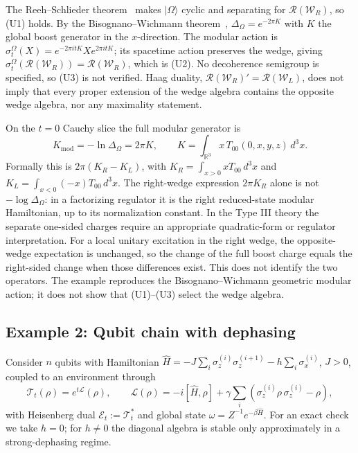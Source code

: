 The Reeh--Schlieder theorem~\cite{Haag1996} makes $|\Omega\rangle$ cyclic and separating for $\mathcal{R}(\mathcal{W}_R)$, so (U1) holds. By the Bisognano--Wichmann theorem~\cite{BisognanoWichmann1975, BisognanoWichmann1976}, $\Delta_\Omega = e^{-2\pi K}$ with $K$ the global boost generator in the $x$-direction. The modular action is $\sigma_t^\Omega(X)=e^{-2\pi itK}Xe^{2\pi itK}$; its spacetime action preserves the wedge, giving $\sigma_t^\Omega(\mathcal{R}(\mathcal{W}_R)) = \mathcal{R}(\mathcal{W}_R)$, which is (U2). No decoherence semigroup is specified, so (U3) is not verified. Haag duality, $\mathcal R(\mathcal W_R)'=\mathcal R(\mathcal W_L)$, does not imply that every proper extension of the wedge algebra contains the opposite wedge algebra, nor any maximality statement.

On the $t=0$ Cauchy slice the full modular generator is
\begin{equation}
K_{\mathrm{mod}} = -\ln \Delta_\Omega = 2\pi K,
\qquad K=\int_{\mathbb R^3}x\,T_{00}(0,x,y,z)\,d^3x .
\end{equation}
Formally this is $2\pi(K_R-K_L)$, with $K_R=\int_{x>0}xT_{00}\,d^3x$ and $K_L=\int_{x<0}(-x)T_{00}\,d^3x$. The right-wedge expression $2\pi K_R$ alone is not $-\log\Delta_\Omega$: in a factorizing regulator it is the right reduced-state modular Hamiltonian, up to its normalization constant. In the Type III theory the separate one-sided charges require an appropriate quadratic-form or regulator interpretation. For a local unitary excitation in the right wedge, the opposite-wedge expectation is unchanged, so the change of the full boost charge equals the right-sided change when those differences exist. This does not identify the two operators. The example reproduces the Bisognano--Wichmann geometric modular action; it does not show that (U1)--(U3) select the wedge algebra.

\subsection{Example 2: Qubit chain with dephasing}
\label{sec:qubit}

Consider $n$ qubits with Hamiltonian $\hat{H} = -J \sum_{i} \sigma_z^{(i)} \sigma_z^{(i+1)} - h \sum_{i} \sigma_x^{(i)}$, $J > 0$, coupled to an environment through
\begin{equation}
\label{eq:lindblad}
\mathcal{T}_t(\rho) = e^{t\mathcal{L}}(\rho), \qquad \mathcal{L}(\rho) = -i[\hat{H}, \rho] + \gamma \sum_i \left(\sigma_z^{(i)} \rho\, \sigma_z^{(i)} - \rho\right),
\end{equation}
with Heisenberg dual $\mathcal E_t:=\mathcal T_t^*$ and global state $\omega = Z^{-1} e^{-\beta \hat{H}}$. For an exact check we take $h=0$; for $h\ne0$ the diagonal algebra is stable only approximately in a strong-dephasing regime.

